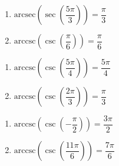 \begin{multicols}{2}

\begin{enumerate}

\setcounter{enumi}{\value{HW}}

\item  $\text{arcsec}\left(\sec\left(\dfrac{5\pi}{3}\right) \right) = \dfrac{\pi}{3}$
\item  $\text{arccsc}\left(\csc\left(\dfrac{\pi}{6}\right) \right) = \dfrac{\pi}{6}$ 

\setcounter{HW}{\value{enumi}}

\end{enumerate}

\end{multicols}

\begin{multicols}{2}

\begin{enumerate}

\setcounter{enumi}{\value{HW}}

\item  $\text{arccsc}\left(\csc\left(\dfrac{5\pi}{4}\right) \right) = \dfrac{5\pi}{4}$
\item  $\text{arccsc}\left(\csc\left( \dfrac{2\pi}{3} \right) \right) = \dfrac{\pi}{3}$

\setcounter{HW}{\value{enumi}}

\end{enumerate}

\end{multicols}

\begin{multicols}{2}

\begin{enumerate}

\setcounter{enumi}{\value{HW}}

\item  $\text{arccsc}\left(\csc\left(-\dfrac{\pi}{2} \right) \right) = \dfrac{3\pi}{2}$ 
\item  $\text{arccsc}\left(\csc\left(\dfrac{11\pi}{6}\right) \right) = \dfrac{7\pi}{6}$

\setcounter{HW}{\value{enumi}}

\end{enumerate}

\end{multicols}

